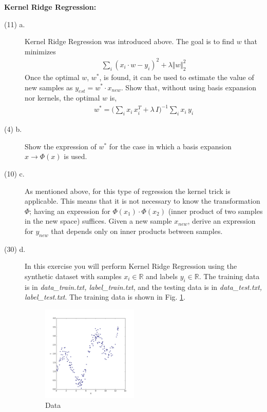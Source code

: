 \documentclass[11pt]{article}
\begin{document}
\begin{problem}{75} \textbf{Kernel Ridge Regression:}

\begin{description}
\item[(11) a.] Kernel Ridge Regression was introduced above. The goal is to find $w$ that minimizes 
\begin{align}
\sum_{i} (x_i \cdot w - y_i) ^ 2 + \lambda \Vert w \Vert_2^2
\end{align}
Once the optimal $w$, $w^*$, is found, it can be used to estimate the value of new samples as $y_{est} = w^* \cdot x_{new}$. Show that, without using basis expansion nor kernels, the optimal $w$ is, 
\begin{align}
w^* = \big ( \sum_i x_i \, x_i^T + \lambda \, I \big ) ^ {-1} \sum_i x_i \, y_i
\end{align}
\item[(4) b.] Show the expression of $w^*$ for the case in which a basis expansion $x \rightarrow \Phi(x)$ is used.
\item[(10) c.] As mentioned above, for this type of regression the kernel trick is applicable. This means that it is not necessary to know the transformation $\Phi$; having an expression for $\Phi(x_1) \cdot \Phi(x_2)$ (inner product of two samples in the new space) suffices. Given a new sample $x_{new}$, derive an expression for $y_{new}$ that depends only on inner products between samples.

\item[(30) d.] In this exercise you will perform Kernel Ridge Regression using the synthetic dataset with samples $x_i \in \mathbb{R}$ and labels $y_i \in \mathbb{R}$. The training data is in \textit{data\_train.txt, label\_train.txt}, and the testing data is in \textit{data\_test.txt, label\_test.txt}. The training data is shown in Fig. \ref{fig:data1d}.

\begin{figure}[H]
  \centering
  \includegraphics[width=0.45\textwidth]{train.png}
  \caption{Data}
  \label{fig:data1d}
\end{figure}


\end{description}
\end{problem}
\end{document}

